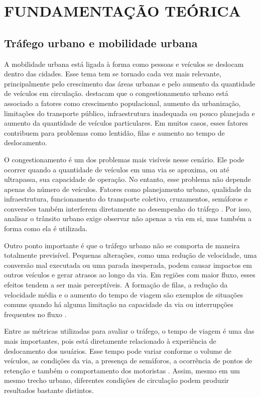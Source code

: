\chapter{FUNDAMENTAÇÃO TEÓRICA}

\section{Tráfego urbano e mobilidade urbana}

A mobilidade urbana está ligada à forma como pessoas e veículos se deslocam dentro das cidades. Esse tema tem se tornado cada vez mais relevante, principalmente pelo crescimento das áreas urbanas e pelo aumento da quantidade de veículos em circulação.  destacam que o congestionamento urbano está associado a fatores como crescimento populacional, aumento da urbanização, limitações do transporte público, infraestrutura inadequada ou pouco planejada e aumento da quantidade de veículos particulares. Em muitos casos, esses fatores contribuem para problemas como lentidão, filas e aumento no tempo de deslocamento.

O congestionamento é um dos problemas mais visíveis nesse cenário. Ele pode ocorrer quando a quantidade de veículos em uma via se aproxima, ou até ultrapassa, sua capacidade de operação. No entanto, esse problema não depende apenas do número de veículos. Fatores como planejamento urbano, qualidade da infraestrutura, funcionamento do transporte coletivo, cruzamentos, semáforos e conversões também interferem diretamente no desempenho do tráfego \cite{thakre_2024}. Por isso, analisar o trânsito urbano exige observar não apenas a via em si, mas também a forma como ela é utilizada.

Outro ponto importante é que o tráfego urbano não se comporta de maneira totalmente previsível. Pequenas alterações, como uma redução de velocidade, uma conversão mal executada ou uma parada inesperada, podem causar impactos em outros veículos e gerar atrasos ao longo da via. Em regiões com maior fluxo, esses efeitos tendem a ser mais perceptíveis. A formação de filas, a redução da velocidade média e o aumento do tempo de viagem são exemplos de situações comuns quando há alguma limitação na capacidade da via ou interrupções frequentes no fluxo \cite{yu_2016}.

Entre as métricas utilizadas para avaliar o tráfego, o tempo de viagem é uma das mais importantes, pois está diretamente relacionado à experiência de deslocamento dos usuários. Esse tempo pode variar conforme o volume de veículos, as condições da via, a presença de semáforos, a ocorrência de pontos de retenção e também o comportamento dos motoristas \cite{yu_2016}. Assim, mesmo em um mesmo trecho urbano, diferentes condições de circulação podem produzir resultados bastante distintos.

